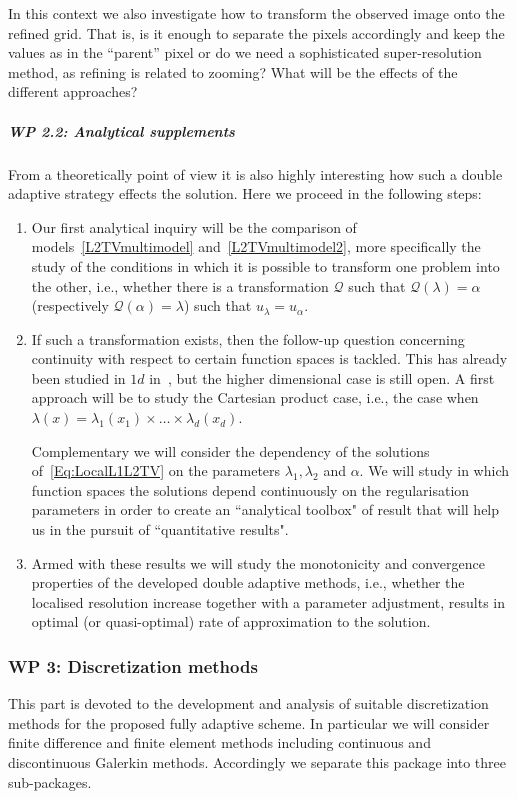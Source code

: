 \documentclass[enabledeprecatedfontcommands,cleardoublepage=empty,headsepline,twoside,11pt,DIV=15,BCOR=12mm,final]{scrartcl}
\begin{document}
In this context we also investigate how to transform the observed image onto the refined grid. That is, is it enough to separate the pixels accordingly and keep the values as in the ``parent'' pixel or do we need a sophisticated super-resolution method, as refining is related to zooming? What will be the effects of the different approaches?

\subparagraph{WP 2.2: Analytical supplements}

From a theoretically point of view it is also highly interesting how such a double adaptive strategy effects the solution. Here we proceed in the following steps:
 
 \begin{enumerate}
 \item Our first analytical inquiry will be the comparison of models~\eqref{L2TVmultimodel} and~\eqref{L2TVmultimodel2}, more specifically the study of the conditions in which it is possible to transform one problem into the other, i.e., whether there is a transformation $\mathcal{Q}$ such that $\mathcal{Q}(\lambda)=\alpha$ (respectively $\mathcal{Q}(\alpha)=\lambda$) such that $u_\lambda = u_\alpha$. 
 
 \item If such a transformation exists, then the follow-up question concerning continuity with respect to certain function spaces is tackled. This has already been studied in $1d$ in~\cite{HiPaRa:17}, but the higher dimensional case is still open. A first approach will be to study the Cartesian product case, i.e., the case when $\lambda(x)=\lambda_1(x_1)\times \dots \times \lambda_d(x_d)$.

Complementary we will consider the dependency of the solutions of~\eqref{Eq:LocalL1L2TV} on the parameters $\lambda_1, \lambda_2$ and $\alpha$. We will study in which function spaces the solutions depend continuously on the regularisation parameters in order to create an ``analytical toolbox" of result that will help us in the pursuit of ``quantitative results". 
 
 \item Armed with these results we will study the monotonicity and convergence properties of the developed double adaptive methods, i.e., whether the localised resolution increase together with a parameter adjustment, results in optimal (or quasi-optimal) rate of approximation to the solution. 
 \end{enumerate} 

 
\subsubsection*{WP 3: Discretization methods}
This part is devoted to the development and analysis of suitable discretization methods for the proposed fully adaptive scheme.  In particular we will consider finite difference and finite element methods including continuous and discontinuous Galerkin methods. Accordingly we separate this package into three sub-packages.
\end{document}
